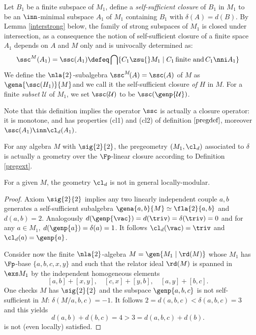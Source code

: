 \begin{dfn}
Let $B_{1}$ be a finite subspace of $M_{1}$, define a \emph{self-sufficient closure} of $B_{1}$ in $M_{1}$ to be an
$\inn$-minimal subspace $A_{1}$ of $M_{1}$ containing $B_{1}$ with $\delta(A)=d(B)$.
By Lemma \ref{interstrong} below, the family of strong subspaces of $M_{1}$ is closed under
intersection, as a consequence the notion of self-sufficient closure of a finite space $A_{1}$ depends on
$A$ and $M$ only and is univocally determined as:
$$\ssc^{M}(A_{1})=\ssc(A_{1})\defeq\bigcap\{C_{1}\zsu{}M_{1}\mid C_{1}\, \text{finite and}\, C_{1}\nni A_{1} \}$$
We define the $\nla{2}$-subalgebra $\ssc^{M}\!(A)=\ssc(A)$ of $M$ as $\gena{\ssc(H_{1})}{M}$and we call it
the self-sufficient closure {\em of} $H$ in $M$. For a finite {\em subset} $\mathcal{U}$ of $M_{1}$, we set $\ssc(\mathcal{U})$
to be $\ssc(\genp{\mathcal{U}})$.
\end{dfn}

\smallskip
Note that this definition implies the operator $\ssc$ is actually a closure operator:
it is monotone, and has properties (cl1) and (cl2) of definition $\ref{pregdef}$, moreover
$\ssc(A_{1})\inn\cl_{d}(A_{1})$.


\begin{cor}\label{2geom}
For any algebra $M$ with $\sig{2}{2}$, the pregeometry $(M_{1},\cl_{d})$ associated to $\delta$ is actually a
geometry over the $\Fp$-linear closure according to Definition \ref{pregext}.

For a given $M$, the geometry  $\cl_{d}$ is not in general locally-modular.
\end{cor}
\begin{proof}
Axiom $\sig{2}{2}$ implies any two linearly independent couple $a,b$ generates a self-sufficient
subalgebra $\gena{a,b}{M}\simeq\fla{2}{a,b}$ and $d(a,b)=2$. Analogously
$d(\genp{\vac})=d(\triv)=\delta(\triv)=0$ and for any $a\in M_{1}$, $d(\genp{a})=
\delta(a)=1$. It follows $\cl_{d}(\vac)=\triv$ and $\cl_{d}(a)=\genp{a}$.

\smallskip
Consider now the finite $\nla{2}$-algebra $M=\gen{M_{1}\mid\rd(M)}$ whose $M_{1}$ has $\Fp$-base $\{a,b,c,x,y\}$ and such that the relator ideal $\rd(M)$
is spanned in $\exs M_{1}$ by the independent homogeneous elements
$$[a,b]+[x,y],\quad[c,x]+[y,b],\quad[a,y]+[b,c].$$
One checks $M$ has $\sig{2}{2}$ and the subspace $\genp{a,b,c}$ is not self-sufficient in $M$: $\delta(M/a,b,c)=-1$. It follows
$2=d(a,b,c)<\delta(a,b,c)=3$ and this yields
$$d(a,b)+d(b,c)=4>3=d(a,b,c)+d(b).$$
 is not (even locally) satisfied.
\end{proof}

